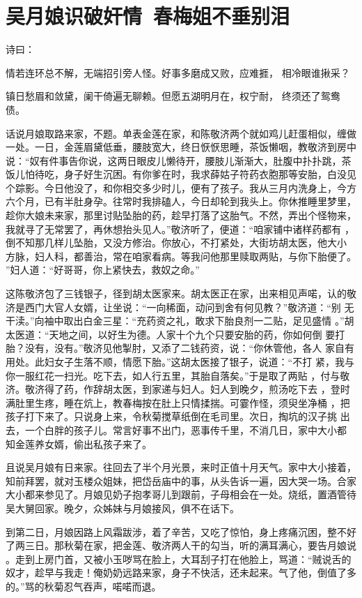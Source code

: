 \chapter{吴月娘识破奸情~春梅姐不垂别泪}

诗曰：

情若连环总不解，无端招引旁人怪。好事多磨成又败，应难捱，
相冷眼谁揪采？

镇日愁眉和敛黛，阑干倚遍无聊赖。但愿五湖明月在，权宁耐，
终须还了鸳鸯债。

话说月娘取路来家，不题。单表金莲在家，和陈敬济两个就如鸡儿赶蛋相似，缠做
一处。一日，金莲眉黛低垂，腰肢宽大，终日恹恹思睡，茶饭懒咽，教敬济到房中
说：“奴有件事告你说，这两日眼皮儿懒待开，腰肢儿渐渐大，肚腹中扑扑跳，茶
饭儿怕待吃，身子好生沉困。有你爹在时，我求薛姑子符药衣胞那等安胎，白没见
个踪影。今日他没了，和你相交多少时儿，便有了孩子。我从三月内洗身上，今方
六个月，已有半肚身孕。往常时我排磕人，今日却轮到我头上。你休推睡里梦里，
趁你大娘未来家，那里讨贴坠胎的药，趁早打落了这胎气。不然，弄出个怪物来，
我就寻了无常罢了，再休想抬头见人。”敬济听了，便道：“咱家铺中诸样药都有
，倒不知那几样儿坠胎，又没方修治。你放心，不打紧处，大街坊胡太医，他大小
方脉，妇人科，都善治，常在咱家看病。等我问他那里赎取两贴，与你下胎便了。
”妇人道：“好哥哥，你上紧快去，救奴之命。”

这陈敬济包了三钱银子，径到胡太医家来。胡太医正在家，出来相见声喏，认的敬
济是西门大官人女婿，让坐说：“一向稀面，动问到舍有何见教？”敬济道：“别
无干渎。”向袖中取出白金三星：“充药资之礼，敢求下胎良剂一二贴，足见盛情
。”胡太医道：“天地之间，以好生为德。人家十个九个只要安胎的药，你如何倒
要打胎？没有，没有。”敬济见他掣肘，又添了二钱药资，说：“你休管他，各人
家自有用处。此妇女子生落不顺，情愿下胎。”这胡太医接了银子，说道：“不打
紧，我与你一服红花一扫光。吃下去，如人行五里，其胎自落矣。”于是取了两贴
，付与敬济。敬济得了药，作辞胡太医，到家递与妇人。妇人到晚夕，煎汤吃下去
，登时满肚里生疼，睡在炕上，教春梅按在肚上只情揉揣。可霎作怪，须臾坐净桶
，把孩子打下来了。只说身上来，令秋菊搅草纸倒在毛司里。次日，掏坑的汉子挑
出去，一个白胖的孩子儿。常言好事不出门，恶事传千里，不消几日，家中大小都
知金莲养女婿，偷出私孩子来了。

且说吴月娘有日来家。往回去了半个月光景，来时正值十月天气。家中大小接着，
知前拜罢，就对玉楼众姐妹，把岱岳庙中的事，从头告诉一遍，因大哭一场。合家
大小都来参见了。月娘见奶子抱孝哥儿到跟前，子母相会在一处。烧纸，置酒管待
吴大舅回家。晚夕，众姊妹与月娘接风，俱不在话下。

到第二日，月娘因路上风霜跋涉，着了辛苦，又吃了惊怕，身上疼痛沉困，整不好
了两三日。那秋菊在家，把金莲、敬济两人干的勾当，听的满耳满心，要告月娘说
。走到上房门首，又被小玉哕骂在脸上，大耳刮子打在他脸上，骂道：“贼说舌的
奴才，趁早与我走！俺奶奶远路来家，身子不快活，还未起来。气了他，倒值了多
的。”骂的秋菊忍气吞声，喏喏而退。

